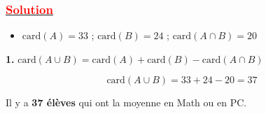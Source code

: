 \documentclass[a4paper,12pt]{article}
\begin{document}
\subsubsection*{\underline{\textcolor{red}{Solution}}}

\begin{itemize}
    \item $\text{card}(A) = 33$ ; \quad $\text{card}(B) = 24$ ; \quad $\text{card}(A \cap B) = 20$
\end{itemize}

\textbf{1.} \quad $\text{card}(A \cup B) = \text{card}(A) + \text{card}(B) - \text{card}(A \cap B)$

\[
\text{card}(A \cup B) = 33 + 24 - 20 = 37
\]

Il y a \textbf{37 élèves} qui ont la moyenne en Math ou en PC.
\end{document}
